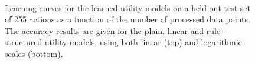 \begin{figure}[p!]
\begin{center}\end{center} $\phantom{a}$\vspace{1cm}$\phantom{a}$ 
\begin{center}\end{center}
\caption{Learning curves for the learned utility models on a held-out test set of 255 actions as a function of the number of processed data points.  The accuracy results are given for the plain, linear and rule-structured utility models, using both linear (top) and logarithmic scales (bottom).}
\label{results}
\end{figure}

